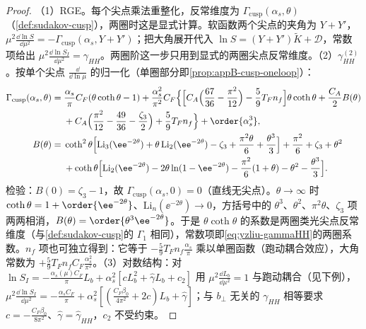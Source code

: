 \begin{proof}
（1）RGE。每个尖点乘法重整化，反常维度为 $\Gamma_{\mathrm{cusp}}(\alpha_s,\theta)$（\cref{def:sudakov-cusp}），两圈时这是显式计算\cite{KorchemskyRadyushkin1987}。软函数两个尖点的夹角为 $Y+Y'$，$\mu^2\frac{\dd\ln S}{\dd\mu^2}=-\Gamma_{\mathrm{cusp}}(\alpha_s,Y+Y')$；把大角展开代入 $\ln S=(Y+Y')\tilde K+\mathcal D$，常数项给出 $\mu^2\frac{\dd\ln S_I}{\dd\mu^2}=\gamma_{HH}$。两圈阶这一步只用到显式的两圈尖点反常维度。（2）$\gamma^{(2)}_{HH}$。按单个尖点 $\frac{\dd}{\dd\ln\mu}$ 的归一化\cite[式~(13)--(15)]{Becher:2009kw}（单圈部分即\cref{prop:appB-cusp-oneloop}）：
\begin{equation}\label{eq:yzliu-cusp-2loop}
\begin{aligned}
\Gamma_{\mathrm{cusp}}(\alpha_s,\theta)={}&\frac{\alpha_s}{\pi}C_F(\theta\coth\theta-1)+\frac{\alpha_s^2}{\pi^2}C_F\Big\{\Big[C_A\Big(\frac{67}{36}-\frac{\pi^2}{12}\Big)-\frac59T_Fn_f\Big]\theta\coth\theta+\frac{C_A}{2}B(\theta)\\
&+C_A\Big(\frac{\pi^2}{12}-\frac{49}{36}-\frac{\zeta_3}{2}\Big)+\frac59T_Fn_f\Big\}+\order{\alpha_s^3},\\
B(\theta)={}&\coth^2\theta\Big[\mathrm{Li}_3(\ee^{-2\theta})+\theta\,\mathrm{Li}_2(\ee^{-2\theta})-\zeta_3+\frac{\pi^2\theta}{6}+\frac{\theta^3}{3}\Big]+\frac{\pi^2}{6}+\zeta_3+\theta^2\\
&+\coth\theta\Big[\mathrm{Li}_2(\ee^{-2\theta})-2\theta\ln(1-\ee^{-2\theta})-\frac{\pi^2}{6}(1+\theta)-\theta^2-\frac{\theta^3}{3}\Big].
\end{aligned}
\end{equation}
检验：$B(0)=\zeta_3-1$，故 $\Gamma_{\mathrm{cusp}}(\alpha_s,0)=0$（直线无尖点）。$\theta\to\infty$ 时 $\coth\theta=1+\order{\ee^{-2\theta}}$、$\mathrm{Li}_n(\ee^{-2\theta})\to0$，方括号中的 $\theta^3$、$\theta^2$、$\pi^2\theta$、$\zeta_3$ 项两两相消，$B(\theta)=\order{\theta^3\ee^{-2\theta}}$。于是 $\theta\coth\theta$ 的系数是两圈类光尖点反常维度（与\cref{def:sudakov-cusp}的 $\Gamma_1$ 相同），常数项即\cref{eq:yzliu-gammaHH}的两圈系数。$n_f$ 项也可独立得到：它等于 $-\frac59T_Fn_f\frac{\alpha_s}{\pi}$ 乘以单圈函数（跑动耦合效应），大角常数为 $+\frac59T_Fn_fC_F\frac{\alpha_s^2}{\pi^2}$。（3）对数结构：对 $\ln S_I=-\frac{\alpha_s(\mu)C_F}{\pi}L_b+\alpha_s^2[cL_b^2+\hat\gamma L_b+c_2]$ 用 $\mu^2\frac{\dd L_b}{\dd\mu^2}=1$ 与跑动耦合（见下例），$\mu^2\frac{\dd\ln S_I}{\dd\mu^2}=-\frac{\alpha_sC_F}{\pi}+\alpha_s^2[(\frac{C_F\beta_0}{4\pi^2}+2c)L_b+\hat\gamma]$；与 $b_\perp$ 无关的 $\gamma_{HH}$ 相等要求 $c=-\frac{C_F\beta_0}{8\pi^2}$、$\hat\gamma=\hat\gamma_{HH}$，$c_2$ 不受约束。
\end{proof}

